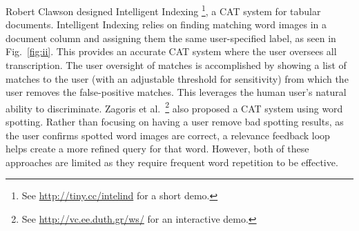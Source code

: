 \documentclass[conference]{IEEEtran}
\begin{document}
Robert Clawson designed Intelligent Indexing \cite{Clawson2014}\footnote{See \url{http://tiny.cc/intelind} for a short demo.}, a CAT system for tabular documents. Intelligent Indexing relies on finding matching word images in a document column and assigning them the same user-specified label, as seen in Fig.~\ref{fig:ii}. This provides an accurate CAT system where the user oversees all transcription. The user oversight of matches is accomplished by showing a list of matches to the user (with an adjustable threshold for sensitivity) from which the user removes the false-positive matches. This leverages the human user's natural ability to discriminate. Zagoris et al.~\cite{Zagoris2015}\footnote{See \url{http://vc.ee.duth.gr/ws/} for an interactive demo.} also proposed a CAT system using word spotting. Rather than focusing on having a user remove bad spotting results, as the user confirms spotted word images are correct, a relevance feedback loop helps create a more refined query for that word. However, both of these approaches are limited as they require frequent word repetition to be effective.
\end{document}

